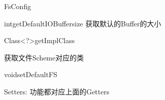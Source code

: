 \begin{XeClass}{FsConfig}
\begin{XeMethod}{\XePublic}{int}{getDefaultIOBuffersize}
 获取默认的Buffer的大小

    \end{XeMethod}

    \begin{XeMethod}{\XePublic}{Class<?>}{getImplClass}
         
 获取文件Scheme对应的类

    \end{XeMethod}

    \begin{XeMethod}{\XePublic}{void}{setDefaultFS}
         
 Setters: 功能都对应上面的Getters

    \end{XeMethod}

\end{XeClass}
